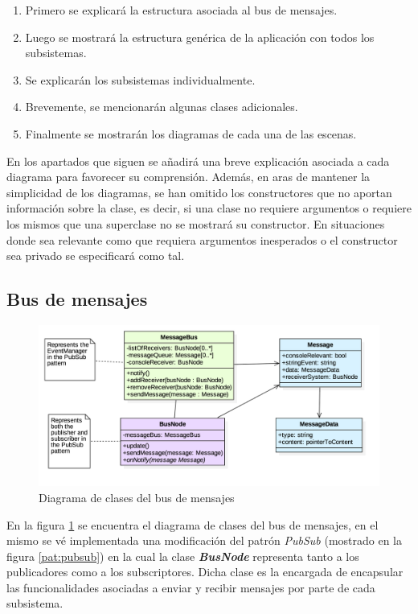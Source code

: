 \begin{enumerate}
	\item Primero se explicará la estructura asociada al bus de mensajes.
	\item Luego se mostrará la estructura genérica de la aplicación con todos los subsistemas.
	\item Se explicarán los subsistemas individualmente.
	\item Brevemente, se mencionarán algunas clases adicionales.
	\item Finalmente se mostrarán los diagramas de cada una de las escenas.
\end{enumerate}

En los apartados que siguen se añadirá una breve explicación asociada a cada diagrama para favorecer su comprensión.  Además, en aras de mantener la simplicidad de los diagramas, se han omitido los constructores que no aportan información sobre la clase, es decir, si una clase no requiere argumentos o requiere los mismos que una superclase no se mostrará su constructor. En situaciones donde sea relevante como que requiera argumentos inesperados o el constructor sea privado se especificará como tal.

\subsection{Bus de mensajes}

\begin{figure}
	\centerline{\includegraphics[width=15cm]{otros/UML/png/alld/png/messaging__diagramaDeClases_messaging_11.png}}
	\caption{Diagrama de clases del bus de mensajes}
	\label{class:messageBus}
\end{figure}

En la figura \ref{class:messageBus} se encuentra el diagrama de clases del bus de mensajes, en el mismo se vé implementada una modificación del patrón \textit{PubSub} (mostrado en la figura \ref{pat:pubsub}) en la cual la clase \textbf{\textit{BusNode}} representa tanto a los publicadores como a los subscriptores. Dicha clase es la encargada de encapsular las funcionalidades asociadas a enviar y recibir mensajes por parte de cada subsistema.

